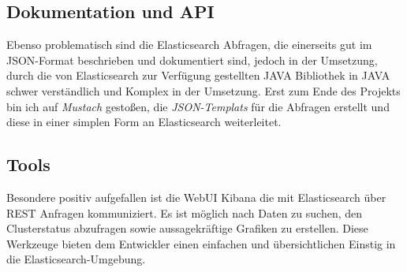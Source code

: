 \subsection{Dokumentation und API}
Ebenso problematisch sind die Elasticsearch Abfragen, die einerseits gut im JSON-Format beschrieben und dokumentiert sind, jedoch in der Umsetzung, durch die von Elasticsearch zur Verfügung gestellten JAVA Bibliothek in JAVA schwer verständlich und Komplex in der Umsetzung.
Erst zum Ende des Projekts bin ich auf \textit{Mustach} gestoßen, die \textit{JSON-Templats} für die Abfragen erstellt und diese in einer simplen Form an Elasticsearch weiterleitet.  

\subsection{Tools} 
Besondere positiv aufgefallen ist die WebUI Kibana die mit Elasticsearch über REST Anfragen kommuniziert. Es ist möglich nach Daten zu suchen, den Clusterstatus abzufragen sowie aussagekräftige Grafiken zu erstellen. Diese Werkzeuge bieten dem Entwickler einen einfachen und übersichtlichen Einstig in die Elasticsearch-Umgebung.    
